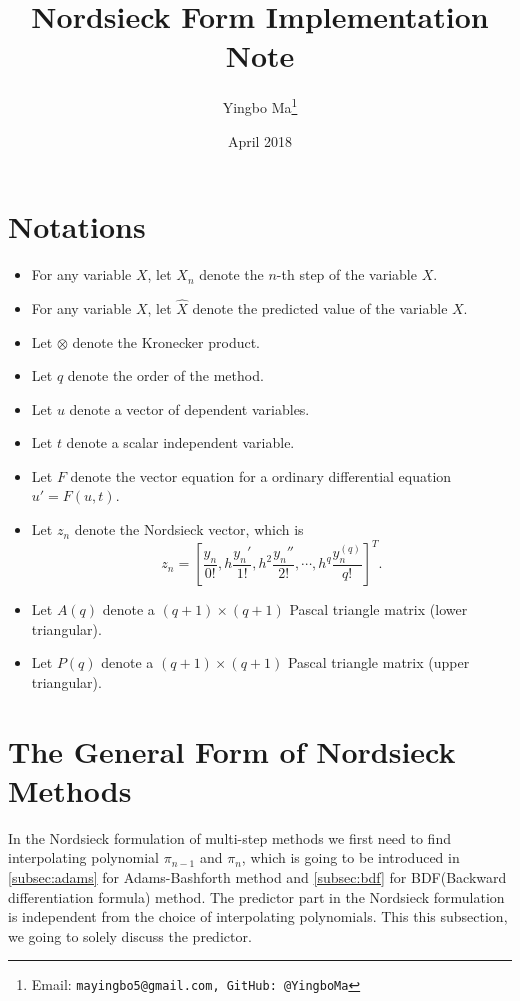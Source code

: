 \documentclass[11pt,a4paper]{article}
\title{Nordsieck Form Implementation Note}
\author{Yingbo Ma\thanks{Email: \tt{mayingbo5@gmail.com},
                         GitHub: \tt{@YingboMa}}}
\date{April 2018}
\begin{document}
\maketitle

\section*{Notations}
\begin{multicols}{2}
  \begin{itemize}
    \item For any variable $X$, let $X_n$ denote the $n$-th step of the variable $X$.
    \item For any variable $X$, let $\hat{X}$ denote the predicted value of the variable $X$.
    \item Let $\otimes$ denote the Kronecker product.
    \item Let $q$ denote the order of the method.
    \item Let $u$ denote a vector of dependent variables.
    \item Let $t$ denote a scalar independent variable.
    \columnbreak
    \item Let $F$ denote the vector equation for a ordinary differential equation
      $u' = F(u, t)$.
    \item Let $z_n$ denote the Nordsieck vector, which is
      \[
        z_n = \left[\frac{y_n}{0!}, h\frac{y_n'}{1!}, h^2\frac{y_n''}{2!},
        \cdots, h^q\frac{y_n^{(q)}}{q!}\right]^T.
      \]
    \item Let $A(q)$ denote a $(q+1)\times (q+1)$ Pascal triangle matrix (lower
      triangular).
    \item Let $P(q)$ denote a $(q+1)\times (q+1)$ Pascal triangle matrix (upper
      triangular).
  \end{itemize}
\end{multicols}

\section{The General Form of Nordsieck Methods}
In the Nordsieck formulation of multi-step methods we first need to find
interpolating polynomial $\pi_{n-1}$ and $\pi_n$, which is going to be
introduced in \cref{subsec:adams} for Adams-Bashforth method and
\cref{subsec:bdf} for BDF(Backward differentiation formula) method. The
predictor part in the Nordsieck formulation is independent from the choice of
interpolating polynomials. This this subsection, we going to solely discuss the
predictor.
\end{document}
